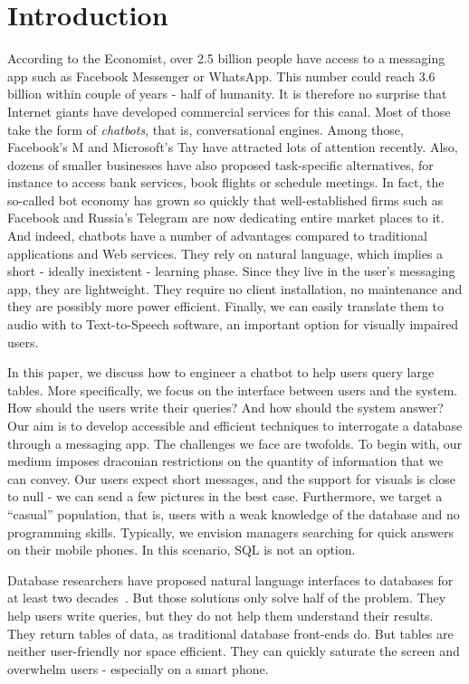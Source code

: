 \section{Introduction}
\label{sec:intro}

According to the Economist, over 2.5 billion people have access to a messaging
app such as Facebook Messenger or WhatsApp. This number could reach 3.6 billion
within couple of years - half of humanity. It is therefore no surprise that
Internet giants have developed commercial services for this canal. Most of
those take the form of \emph{chatbots}, that is, conversational engines.  Among
those, Facebook's M and Microsoft's Tay have attracted lots of attention
recently.  Also, dozens of smaller businesses have also proposed task-specific
alternatives, for instance to access bank services, book flights or schedule
meetings. In fact, the so-called bot economy has grown so quickly that
well-established firms such as Facebook and Russia's Telegram are now
dedicating entire market places to it.  And indeed, chatbots have a number of
advantages compared to traditional applications and Web services. They rely on
natural language, which implies a short - ideally inexistent - learning phase.
Since they live in the user's messaging app, they are lightweight.
They require no client installation, no maintenance and they are possibly more
power efficient. Finally, we can easily translate them to audio with to
Text-to-Speech software, an important option for visually impaired users.

In this paper, we discuss how to engineer a chatbot to help users query large
tables.  More specifically, we focus on the interface between users and the
system. How should the users write their queries? And how should the system
answer? Our aim is to develop accessible and efficient techniques to
interrogate a database through a messaging app.  The challenges we face are
twofolds. To begin with, our medium imposes draconian restrictions on the
quantity of information that we can convey. Our users expect short messages,
and the support for visuals is close to null - we can send a few pictures in
the best case.  Furthermore, we target a ``casual'' population, that is, users
with a weak knowledge of the database and no programming skills.  Typically, we
envision managers searching for quick answers on their mobile phones. In this
scenario, SQL is not an option.

Database researchers have proposed natural language interfaces to databases for
at least two decades~\cite{androutsopoulos1995natural}. But those solutions
only solve half of the problem. They help users write queries, but they do not
help them understand their results.  They return tables of data, as traditional
database front-ends do.  But tables are neither user-friendly nor
space efficient. They can quickly saturate the screen and overwhelm users -
especially on a smart phone.  

